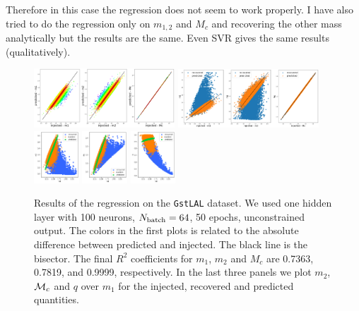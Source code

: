 \documentclass[prd,aps,twocolumn,a4paper,showkeys,nofootinbib]{revtex4-1}
\def\Mc{{\cal M}_c}
\begin{document}
Therefore in this case the regression does not seem to work properly. I have also tried to 
do the regression only on $m_{1,2}$ and $M_c$ and recovering the other mass analytically 
but the results are the same. Even SVR gives the same results (qualitatively).
%
\begin{figure}[]
  \center
  \includegraphics[width=0.47\textwidth]{./Figs/GstLAL_regression.png}
  \includegraphics[width=0.47\textwidth]{./Figs/GstLAL_regression_noise.png}
  \includegraphics[width=0.15\textwidth]{./Figs/GstLAL_m2.png}
  \includegraphics[width=0.15\textwidth]{./Figs/GstLAL_Mc.png}
  \includegraphics[width=0.15\textwidth]{./Figs/GstLAL_q.png}
  \caption{\label{fig:GstLAL_results} Results of the regression on the \texttt{GstLAL}
  dataset. We used one hidden layer with 100 neurons, $N_{\rm batch}=64$, 50 epochs,  
  unconstrained output.
  The colors in the first plots is related to the absolute difference between predicted 
  and injected. The black line is the bisector.
  The final $R^2$ coefficients for $m_1$, $m_2$ and $M_c$ 
  are 0.7363, 0.7819, and 0.9999, respectively.
  In the last three panels we plot $m_2$, $\Mc$ and $q$ over $m_1$ for the injected, recovered
  and predicted quantities.}
\end{figure}
\end{document}
